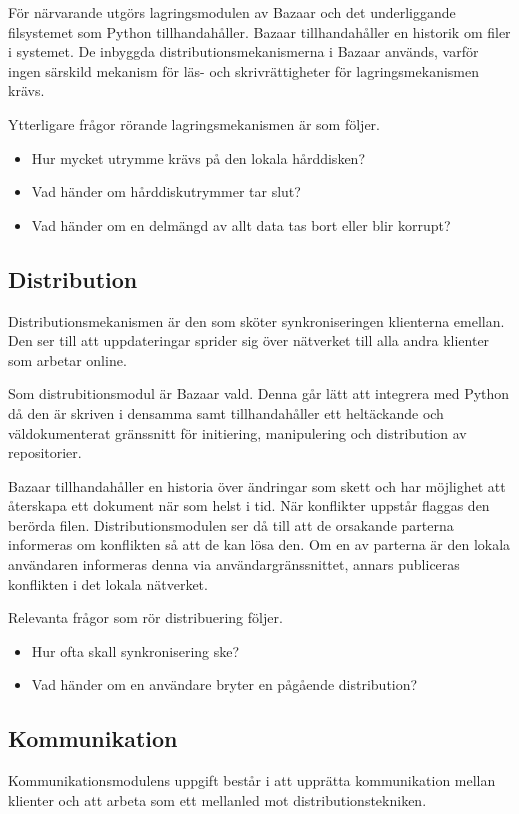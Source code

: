 För närvarande utgörs lagringsmodulen av Bazaar och det underliggande
filsystemet som Python tillhandahåller. Bazaar tillhandahåller en
historik om filer i systemet. De inbyggda distributionsmekanismerna i
Bazaar används, varför ingen särskild mekanism för läs- och
skrivrättigheter för lagringsmekanismen krävs.

Ytterligare frågor rörande lagringsmekanismen är som följer.
\begin{itemize}
\item Hur mycket utrymme krävs på den lokala hårddisken?
\item Vad händer om hårddiskutrymmer tar slut?
\item Vad händer om en delmängd av allt data tas bort eller blir korrupt?
\end{itemize}
\subsection{Distribution}
Distributionsmekanismen är den som sköter synkroniseringen klienterna
emellan. Den ser till att uppdateringar sprider sig över nätverket
till alla andra klienter som arbetar online.

Som distrubitionsmodul är Bazaar vald. Denna går lätt att integrera
med Python då den är skriven i densamma samt tillhandahåller ett
heltäckande och väldokumenterat gränssnitt för initiering,
manipulering och distribution av repositorier.

Bazaar tillhandahåller en historia över ändringar som skett och har
möjlighet att återskapa ett dokument när som helst i tid. När
konflikter uppstår flaggas den berörda filen. Distributionsmodulen ser
då till att de orsakande parterna informeras om konflikten så att de
kan lösa den. Om en av parterna är den lokala användaren informeras
denna via användargränssnittet, annars publiceras konflikten i det
lokala nätverket.

Relevanta frågor som rör distribuering följer.
\begin{itemize}
\item Hur ofta skall synkronisering ske?
\item Vad händer om en användare bryter en pågående distribution?
\end{itemize}
\subsection{Kommunikation}
Kommunikationsmodulens uppgift består i att upprätta kommunikation
mellan klienter och att arbeta som ett mellanled mot
distributionstekniken.

